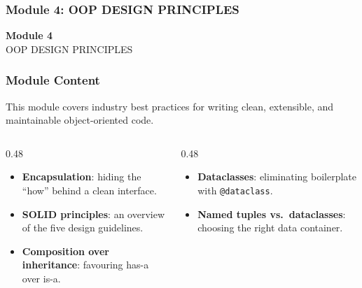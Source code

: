 \documentclass[aspectratio=169,10pt]{beamer}
\newcommand{\keyword}[1]{\textcolor{PrimaryBlue}{\textbf{#1}}}
\newcommand{\codeword}[1]{\texttt{#1}}
\begin{document}
\begin{noheadline}
\begin{frame}
\frametitle{Module 4: OOP DESIGN PRINCIPLES}
\vspace{1.2cm}
\begin{center}
  {\fontsize{30}{36}\selectfont\textbf{Module 4}}\\[0.35cm]
  {\fontsize{25}{30}\selectfont OOP DESIGN PRINCIPLES}\\[0.7cm]
\end{center}
\end{frame}
\end{noheadline}


\begin{frame}
\frametitle{Module Content}
\small
This module covers industry best practices for writing clean, extensible, and maintainable object-oriented code.

\vspace{0.16cm}
\begin{columns}[T,totalwidth=0.96\textwidth]
\begin{column}{0.48\textwidth}
\begin{itemize}\setlength\itemsep{0.08cm}
  \item \keyword{Encapsulation}: hiding the ``how'' behind a clean interface.
  \item \keyword{SOLID principles}: an overview of the five design guidelines.
  \item \keyword{Composition over inheritance}: favouring has-a over is-a.
\end{itemize}
\end{column}
\begin{column}{0.48\textwidth}
\begin{itemize}\setlength\itemsep{0.08cm}
  \item \keyword{Dataclasses}: eliminating boilerplate with \codeword{@dataclass}.
  \item \keyword{Named tuples vs.\ dataclasses}: choosing the right data container.
\end{itemize}
\end{column}
\end{columns}
\end{frame}
\end{document}
